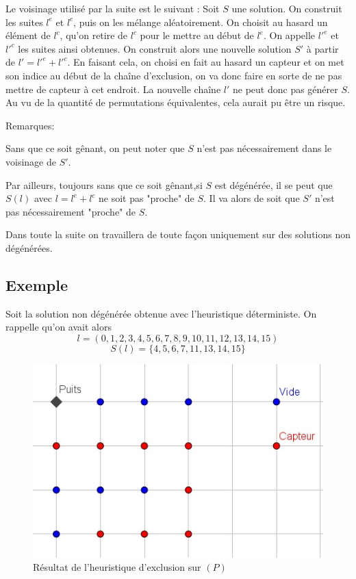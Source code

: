 \documentclass[12pt,a4paper]{article}
\begin{document}
Le voisinage utilisé par la suite est le suivant :
Soit $S$ une solution. On construit les suites $l^e$ et $l^c$, puis on les mélange aléatoirement. On choisit au hasard un élément de $l^c$, qu'on retire de $l^c$ pour le mettre au début de $l^e$. On appelle $l'^e$ et $l'^c$ les suites ainsi obtenues. On construit alors une nouvelle solution $S'$ à partir de $l'=l'^e+l'^c$.
En faisant cela, on choisi en fait au hasard un capteur et on met son indice au début de la chaîne d'exclusion, on va donc faire en sorte  de ne pas mettre de capteur à cet endroit. La nouvelle chaîne $l'$ ne peut donc pas générer $S$. Au vu de la quantité de permutations équivalentes, cela aurait pu être un risque.

Remarques:

Sans que ce soit gênant, on peut noter que $S$ n'est pas nécessairement dans le voisinage de $S'$.

Par ailleurs, toujours sans que ce soit gênant,si $S$ est dégénérée, il se peut que $S(l)$ avec $l=l^e+l^c$ ne soit pas "proche" de $S$. Il va alors de soit que $S'$ n'est pas nécessairement "proche" de $S$.

Dans toute la suite on travaillera de toute façon uniquement sur des solutions non dégénérées. 
\subsection{Exemple}
Soit la solution non dégénérée obtenue avec l'heuristique déterministe.
On rappelle qu'on avait alors
\[l=(0,1,2,3,4,5,6,7,8,9,10,11,12,13,14,15)\] 
\[S(l)=\{4,5,6,7,11,13,14,15\}\]
\begin{figure}[h]
\center
\includegraphics[scale=1]{Images/4_1_1_naif.jpg}
\caption{Résultat de l'heuristique d'exclusion sur $(P)$}
\end{figure}
\end{document}
